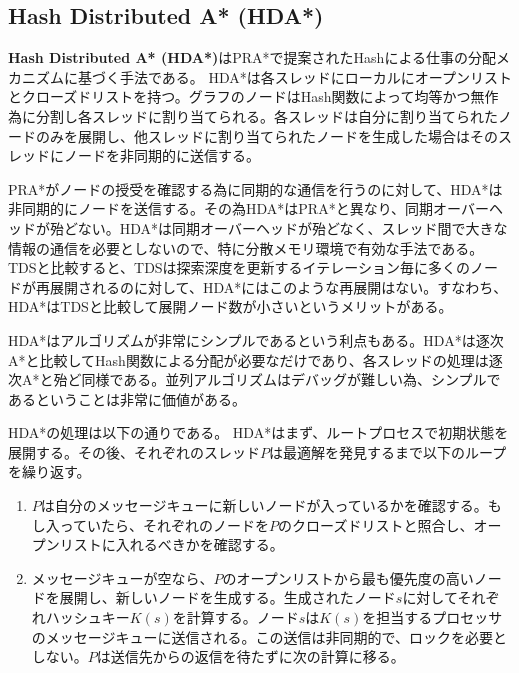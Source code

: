 \documentclass[uplatex]{jsarticle}
\begin{document}
\subsection{Hash Distributed A* (HDA*)}
\textbf{Hash Distributed A* (HDA*)}はPRA*で提案されたHashによる仕事の分配メカニズムに基づく手法である。
HDA*は各スレッドにローカルにオープンリストとクローズドリストを持つ。グラフのノードはHash関数によって均等かつ無作為に分割し各スレッドに割り当てられる。各スレッドは自分に割り当てられたノードのみを展開し、他スレッドに割り当てられたノードを生成した場合はそのスレッドにノードを非同期的に送信する。

PRA*がノードの授受を確認する為に同期的な通信を行うのに対して、HDA*は非同期的にノードを送信する。その為HDA*はPRA*と異なり、同期オーバーヘッドが殆どない。HDA*は同期オーバーヘッドが殆どなく、スレッド間で大きな情報の通信を必要としないので、特に分散メモリ環境で有効な手法である。
TDSと比較すると、TDSは探索深度を更新するイテレーション毎に多くのノードが再展開されるのに対して、HDA*にはこのような再展開はない。すなわち、HDA*はTDSと比較して展開ノード数が小さいというメリットがある。

HDA*はアルゴリズムが非常にシンプルであるという利点もある。HDA*は逐次A*と比較してHash関数による分配が必要なだけであり、各スレッドの処理は逐次A*と殆ど同様である。並列アルゴリズムはデバッグが難しい為、シンプルであるということは非常に価値がある。
\newline



HDA*の処理は以下の通りである。
HDA*はまず、ルートプロセスで初期状態を展開する。その後、それぞれのスレッド$P$は最適解を発見するまで以下のループを繰り返す。

\begin{enumerate}
	\item $P$は自分のメッセージキューに新しいノードが入っているかを確認する。もし入っていたら、それぞれのノードを$P$のクローズドリストと照合し、オープンリストに入れるべきかを確認する。
	\item メッセージキューが空なら、$P$のオープンリストから最も優先度の高いノードを展開し、新しいノードを生成する。生成されたノード$s$に対してそれぞれハッシュキー$K(s)$を計算する。ノード$s$は$K(s)$を担当するプロセッサのメッセージキューに送信される。この送信は非同期的で、ロックを必要としない。$P$は送信先からの返信を待たずに次の計算に移る。
\end{enumerate}
\end{document}
